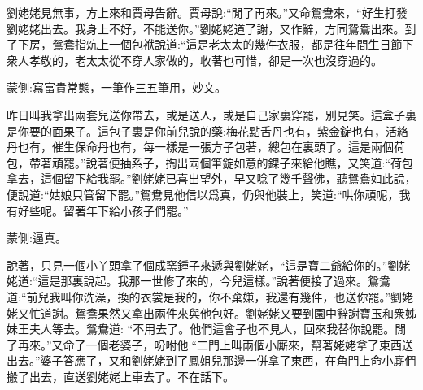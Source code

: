 \begin{parag}
    劉姥姥見無事，方上來和賈母告辭。賈母說:“閒了再來。”又命鴛鴦來，“好生打發劉姥姥出去。我身上不好，不能送你。”劉姥姥道了謝，又作辭，方同鴛鴦出來。到了下房，鴛鴦指炕上一個包袱說道:“這是老太太的幾件衣服，都是往年間生日節下衆人孝敬的，老太太從不穿人家做的，收著也可惜，卻是一次也沒穿過的。\begin{note}蒙側:寫富貴常態，一筆作三五筆用，妙文。\end{note}昨日叫我拿出兩套兒送你帶去，或是送人，或是自己家裏穿罷，別見笑。這盒子裏是你要的面果子。這包子裏是你前兒說的藥:梅花點舌丹也有，紫金錠也有，活絡丹也有，催生保命丹也有，每一樣是一張方子包著，總包在裏頭了。這是兩個荷包，帶著頑罷。”說著便抽系子，掏出兩個筆錠如意的錁子來給他瞧，又笑道:“荷包拿去，這個留下給我罷。”劉姥姥已喜出望外，早又唸了幾千聲佛，聽鴛鴦如此說，便說道:“姑娘只管留下罷。”鴛鴦見他信以爲真，仍與他裝上，笑道:“哄你頑呢，我有好些呢。留著年下給小孩子們罷。”\begin{note}蒙側:逼真。\end{note}說著，只見一個小丫頭拿了個成窯鍾子來遞與劉姥姥，“這是寶二爺給你的。”劉姥姥道:“這是那裏說起。我那一世修了來的，今兒這樣。”說著便接了過來。鴛鴦道:“前兒我叫你洗澡，換的衣裳是我的，你不棄嫌，我還有幾件，也送你罷。”劉姥姥又忙道謝。鴛鴦果然又拿出兩件來與他包好。劉姥姥又要到園中辭謝寶玉和衆姊妹王夫人等去。鴛鴦道: “不用去了。他們這會子也不見人，回來我替你說罷。閒了再來。”又命了一個老婆子，吩咐他:“二門上叫兩個小廝來，幫著姥姥拿了東西送出去。”婆子答應了，又和劉姥姥到了鳳姐兒那邊一併拿了東西，在角門上命小廝們搬了出去，直送劉姥姥上車去了。不在話下。
\end{parag}


